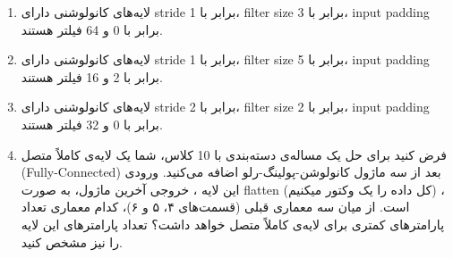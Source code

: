 \begin{enumerate}
\item لایه‌های کانولوشنی دارای stride برابر با 1، filter size برابر با 3، input padding برابر با 0 و 64 فیلتر هستند.

    

\vspace{3cm}

\item لایه‌های کانولوشنی دارای stride برابر با 1، filter size برابر با 5، input padding برابر با 2 و 16 فیلتر هستند.

\vspace{3cm}


\item لایه‌های کانولوشنی دارای stride برابر با 2، filter size برابر با 2، input padding برابر با 0 و 32 فیلتر هستند.

\vspace{3cm}

\item فرض کنید برای حل یک مساله‌ی دسته‌بندی با 10 کلاس، شما یک لایه‌ی کاملاً متصل (Fully-Connected) بعد از سه ماژول کانولوشن-پولینگ-رلو اضافه می‌کنید. ورودی این لایه ، خروجی آخرین ماژول، به صورت flatten (کل داده را یک وکتور میکنیم) ، است. از میان سه معماری قبلی (قسمت‌های ۴، ۵ و ۶)، کدام معماری تعداد پارامترهای کمتری برای لایه‌ی کاملاً متصل خواهد داشت؟ تعداد پارامترهای این لایه را نیز مشخص کنید.

    

\end{enumerate}
